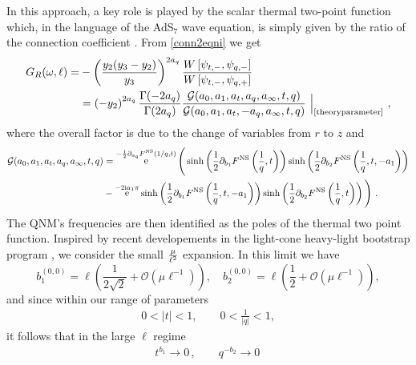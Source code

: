 \documentclass[11pt]{article}
\numberwithin{equation}{section}
\newcommand{\be}{\begin{equation}}
\newcommand{\ee}{\end{equation}}
\newcommand{\ba}{\begin{aligned}}
\newcommand{\ea}{\end{aligned}}
\newcommand{\ri}{{\rm i}}
\DeclareMathOperator{\re}{{\rm e}}
\begin{document}
In this approach, a key role is played by the scalar thermal two-point function which, in the language of the AdS$_7$ wave equation, is simply given by the ratio of the connection coefficient \cite{Son:2002sd, Nunez:2003eq, Policastro:2002se}. From \eqref{conn2eqni} we get 
 \be\label{eq:thermalscal}\ba 
 G_R(\omega, \ell)=&-\left(\frac{y_2 (y_3-y_2)}{ y_3}\right)^{2 a_q}{W\left[\psi_{t,-}, \psi_{q,-}\right]\over W\left[\psi_{t,-},\psi_{q,+}\right]}\\
 &=\left(-y_2\right)^{2 a_q} {\Gamma(-2 a_q)\over \Gamma(2 a_q)}{\mathcal{G} (a_0,a_1,a_t,a_q,a_{\infty}, t,q)\over \mathcal{G}(a_0,a_1,a_t,-a_q,a_{\infty}, t,q)}~\Big|_{\text{\eqref{theoryparameter}}}~,
\ea \ee
where the overall factor is due to the change of variables from $r$ to $z$ and
\begin{equation}
\begin{aligned}\label{eq:gg7d}
\mathcal{G} (a_0, a_1, a_t, a_q, a_{\infty}, t, q)& = 
\re^{-\frac{1}{2} \partial_{a_q}F^{\rm NS}(1/q, t)} \Bigg(
\sinh\left(\frac{1}{2} \partial_{b_1}F^{\rm NS}\left(\frac{1}{q}, t\right)\right) 
\sinh\left(\frac{1}{2} \partial_{b_2}F^{\rm NS}\left(\frac{1}{q}, t, -a_1\right)\right) \\
&- \re^{-2 \ri a_1 \pi} 
\sinh\left(\frac{1}{2} \partial_{b_1}F^{\rm NS}\left(\frac{1}{q}, t, -a_1\right)\right) 
\sinh\left(\frac{1}{2} \partial_{b_2}F^{\rm NS}\left(\frac{1}{q}, t\right)\right)
\Bigg)~.
\end{aligned}  
\end{equation}
The QNM's frequencies are then identified as the poles of the thermal two point function.
Inspired by recent developements in the light-cone heavy-light bootstrap program \cite{Lashkari:2016vgj,Kulaxizi:2018dxo,Karlsson:2019qfi,Karlsson:2019dbd,Karlsson:2021duj,Dodelson:2022eiz}, we consider the small $\mu\over \ell^2$ expansion.
In this limit we have 
\begin{equation}
b_1^{(0,0)}=\ell\left(\frac{1}{2\sqrt{2}}+\mathcal{O}(\mu\ell^{-1})\right),\quad b_2^{(0,0)}=\ell\left(\frac{1}{2}+\mathcal{O}(\mu\ell^{-1})\right),
\end{equation}
%
and since within our range of parameters 
\begin{equation}\label{instantonbehavior}
\begin{aligned}
0<|t|<1,\quad\quad 0<\frac{1}{|q|}<1,
\end{aligned}
\end{equation}
 it follows that in the large $\ell$ regime
\begin{equation}
\begin{aligned}
t^{b_1}\to 0\,,\quad\quad
q^{-b_2}\to 0\,
\end{aligned}
\end{equation}
\end{document}
